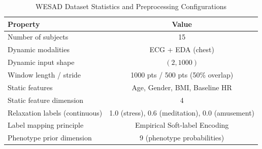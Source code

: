 \documentclass{article}
\begin{document}
\begin{table}[h]
\centering
\caption{WESAD Dataset Statistics and Preprocessing Configurations}
\label{tab:dataset}
\begin{tabular}{lc}
\toprule
\textbf{Property} & \textbf{Value} \\
\midrule
Number of subjects & 15 \\
Dynamic modalities & ECG + EDA (chest) \\
Dynamic input shape & $(2, 1000)$ \\
Window length / stride & 1000 pts / 500 pts (50\% overlap) \\
Static features & Age, Gender, BMI, Baseline HR \\
Static feature dimension & 4 \\
Relaxation labels (continuous) & 1.0 (stress), 0.6 (meditation), 0.0 (amusement)  \\
Label mapping principle & Empirical Soft-label Encoding  \\
Phenotype prior dimension & 9 (phenotype probabilities) \\
\bottomrule
\end{tabular}
\end{table}
\end{document}
